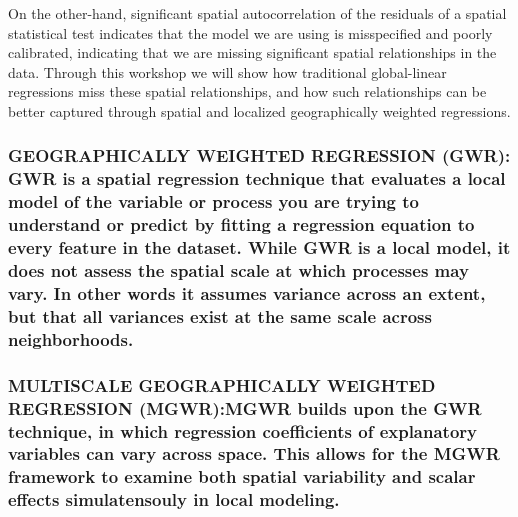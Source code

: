 \documentclass[
  12pt,
]{article}
\begin{document}
On the other-hand, significant spatial autocorrelation of the residuals
of a spatial statistical test indicates that the model we are using is
misspecified and poorly calibrated, indicating that we are missing
significant spatial relationships in the data. Through this workshop we
will show how traditional global-linear regressions miss these spatial
relationships, and how such relationships can be better captured through
spatial and localized geographically weighted regressions.

\hypertarget{geographically-weighted-regression-gwr-gwr-is-a-spatial-regression-technique-that-evaluates-a-local-model-of-the-variable-or-process-you-are-trying-to-understand-or-predict-by-fitting-a-regression-equation-to-every-feature-in-the-dataset.-while-gwr-is-a-local-model-it-does-not-assess-the-spatial-scale-at-which-processes-may-vary.-in-other-words-it-assumes-variance-across-an-extent-but-that-all-variances-exist-at-the-same-scale-across-neighborhoods.}{%
\subsubsection{GEOGRAPHICALLY WEIGHTED REGRESSION (GWR): GWR is a
spatial regression technique that evaluates a local model of the
variable or process you are trying to understand or predict by fitting a
regression equation to every feature in the dataset. While GWR is a
local model, it does not assess the spatial scale at which processes may
vary. In other words it assumes variance across an extent, but that all
variances exist at the same scale across
neighborhoods.}\label{geographically-weighted-regression-gwr-gwr-is-a-spatial-regression-technique-that-evaluates-a-local-model-of-the-variable-or-process-you-are-trying-to-understand-or-predict-by-fitting-a-regression-equation-to-every-feature-in-the-dataset.-while-gwr-is-a-local-model-it-does-not-assess-the-spatial-scale-at-which-processes-may-vary.-in-other-words-it-assumes-variance-across-an-extent-but-that-all-variances-exist-at-the-same-scale-across-neighborhoods.}}

\hypertarget{multiscale-geographically-weighted-regression-mgwrmgwr-builds-upon-the-gwr-technique-in-which-regression-coefficients-of-explanatory-variables-can-vary-across-space.-this-allows-for-the-mgwr-framework-to-examine-both-spatial-variability-and-scalar-effects-simulatensouly-in-local-modeling.}{%
\subsubsection{MULTISCALE GEOGRAPHICALLY WEIGHTED REGRESSION (MGWR):MGWR
builds upon the GWR technique, in which regression coefficients of
explanatory variables can vary across space. This allows for the MGWR
framework to examine both spatial variability and scalar effects
simulatensouly in local
modeling.}\label{multiscale-geographically-weighted-regression-mgwrmgwr-builds-upon-the-gwr-technique-in-which-regression-coefficients-of-explanatory-variables-can-vary-across-space.-this-allows-for-the-mgwr-framework-to-examine-both-spatial-variability-and-scalar-effects-simulatensouly-in-local-modeling.}}
\end{document}
